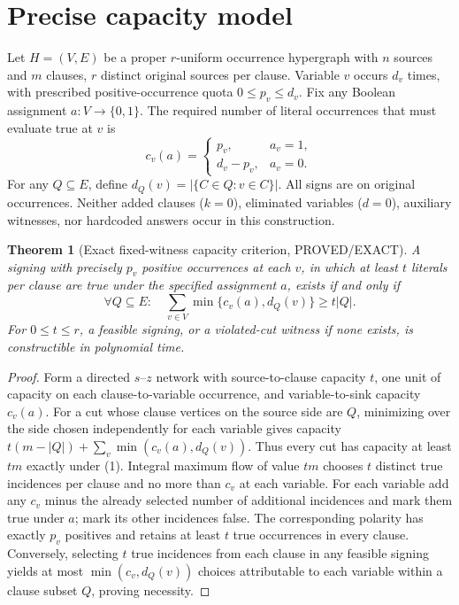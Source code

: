 \documentclass[11pt]{article}
\newtheorem{theorem}{Theorem}
\begin{document}
\section{Precise capacity model}
Let $H=(V,E)$ be a proper $r$-uniform occurrence hypergraph with $n$ sources and $m$ clauses, $r$ distinct original sources per clause. Variable $v$ occurs $d_v$ times, with prescribed positive-occurrence quota $0\le p_v\le d_v$. Fix any Boolean assignment $a:V\to\{0,1\}$. The required number of literal occurrences that must evaluate true at $v$ is
\[
c_v(a)=\begin{cases}p_v,&a_v=1,\\d_v-p_v,&a_v=0.\end{cases}
\]
For any $Q\subseteq E$, define $d_Q(v)=|\{C\in Q:v\in C\}|$. All signs are on original occurrences. Neither added clauses ($k=0$), eliminated variables ($d=0$), auxiliary witnesses, nor hardcoded answers occur in this construction.
\begin{theorem}[Exact fixed-witness capacity criterion, PROVED/EXACT]
A signing with precisely $p_v$ positive occurrences at each $v$, in which at least $t$ literals per clause are true under the \emph{specified} assignment $a$, exists if and only if
\[
\tag{1}\forall Q\subseteq E:\quad \sum_{v\in V}\min\{c_v(a),d_Q(v)\}\ge t|Q|.
\]
For $0\le t\le r$, a feasible signing, or a violated-cut witness if none exists, is constructible in polynomial time.
\end{theorem}
\begin{proof}
Form a directed $s$--$z$ network with source-to-clause capacity $t$, one unit of capacity on each clause-to-variable occurrence, and variable-to-sink capacity $c_v(a)$. For a cut whose clause vertices on the source side are $Q$, minimizing over the side chosen independently for each variable gives capacity
$t(m-|Q|)+\sum_v\min(c_v(a),d_Q(v))$.
Thus every cut has capacity at least $tm$ exactly under (1). Integral maximum flow of value $tm$ chooses $t$ distinct true incidences per clause and no more than $c_v$ at each variable. For each variable add any $c_v$ minus the already selected number of additional incidences and mark them true under $a$; mark its other incidences false. The corresponding polarity has exactly $p_v$ positives and retains at least $t$ true occurrences in every clause. Conversely, selecting $t$ true incidences from each clause in any feasible signing yields at most $\min(c_v,d_Q(v))$ choices attributable to each variable within a clause subset $Q$, proving necessity.
\end{proof}
\end{document}
